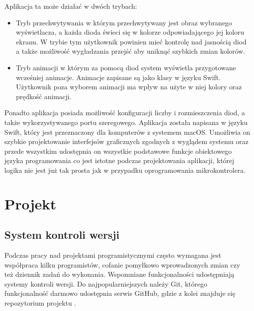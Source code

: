 \documentclass[12pt]{report}
\begin{document}
Aplikacja ta może działać w dwóch trybach:

\begin{itemize}
	\item Tryb przechwytywania w którym przechwytywany jest obraz wybranego wyświetlacza, a każda dioda świeci się w kolorze odpowiadającego jej koloru ekranu. W trybie tym użytkownik powinien mieć kontrolę nad jasnością diod a także możliwość wygładzania przejść aby uniknąć szybkich zmian kolorów.
	\item Tryb animacji w którym za pomocą diod system wyświetla przygotowane wcześniej animacje. Animacje zapisane są jako klasy w języku Swift. Użytkownik poza wyborem animacji ma wpływ na użyte w niej kolory oraz prędkość animacji.
\end{itemize}

Ponadto aplikacja posiada możliwość konfiguracji liczby i rozmieszczenia diod, a także wykorzystywanego portu szeregowego.
Aplikacja została napisana w języku Swift, który jest przeznaczony dla komputerów z systemem macOS. Umożliwia on szybkie projektowanie interfejsów graficznych zgodnych z wyglądem systemu oraz przede wszystkim udostępnia on wszystkie podstawowe funkcje obiektowego języka programowania co jest istotne podczas projektowania aplikacji, której logika nie jest już tak prosta jak w przypadku oprogramowania mikrokontrolera.

\section{Projekt}

\subsection{System kontroli wersji}

Podczas pracy nad projektami programistycznymi często wymagana jest współpraca kilku programistów, cofanie pomyłkowo wprowadzonych zmian czy też dziennik zadań do wykonania. Wspomniane funkcjonalności udostępniają systemy kontroli wersji. Do najpopularniejszych należy Git, którego funkcjonalność darmowo udostępnia serwis   GitHub, gdzie z kolei znajduje się repozytorium projektu \cite{github}.
\end{document}
